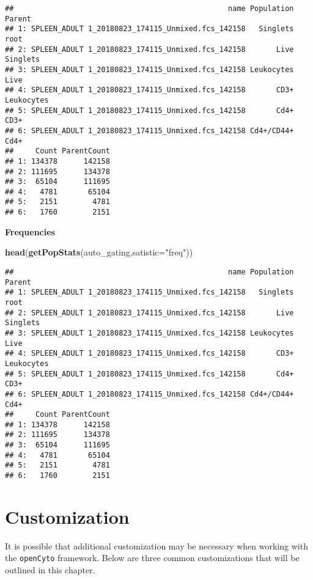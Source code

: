 \documentclass[]{book}
\newenvironment{Shaded}{\begin{snugshade}}{\end{snugshade}}
\newcommand{\DataTypeTok}[1]{\textcolor[rgb]{0.13,0.29,0.53}{#1}}
\newcommand{\KeywordTok}[1]{\textcolor[rgb]{0.13,0.29,0.53}{\textbf{#1}}}
\newcommand{\NormalTok}[1]{#1}
\newcommand{\StringTok}[1]{\textcolor[rgb]{0.31,0.60,0.02}{#1}}
\begin{document}
\begin{verbatim}
##                                                 name Population     Parent
## 1: SPLEEN_ADULT 1_20180823_174115_Unmixed.fcs_142158   Singlets       root
## 2: SPLEEN_ADULT 1_20180823_174115_Unmixed.fcs_142158       Live   Singlets
## 3: SPLEEN_ADULT 1_20180823_174115_Unmixed.fcs_142158 Leukocytes       Live
## 4: SPLEEN_ADULT 1_20180823_174115_Unmixed.fcs_142158       CD3+ Leukocytes
## 5: SPLEEN_ADULT 1_20180823_174115_Unmixed.fcs_142158       Cd4+       CD3+
## 6: SPLEEN_ADULT 1_20180823_174115_Unmixed.fcs_142158 Cd4+/CD44+       Cd4+
##     Count ParentCount
## 1: 134378      142158
## 2: 111695      134378
## 3:  65104      111695
## 4:   4781       65104
## 5:   2151        4781
## 6:   1760        2151
\end{verbatim}

\textbf{Frequencies}

\begin{Shaded}
\begin{Highlighting}[]
\KeywordTok{head}\NormalTok{(}\KeywordTok{getPopStats}\NormalTok{(auto_gating,}\DataTypeTok{satistic=}\StringTok{"freq"}\NormalTok{))}
\end{Highlighting}
\end{Shaded}

\begin{verbatim}
##                                                 name Population     Parent
## 1: SPLEEN_ADULT 1_20180823_174115_Unmixed.fcs_142158   Singlets       root
## 2: SPLEEN_ADULT 1_20180823_174115_Unmixed.fcs_142158       Live   Singlets
## 3: SPLEEN_ADULT 1_20180823_174115_Unmixed.fcs_142158 Leukocytes       Live
## 4: SPLEEN_ADULT 1_20180823_174115_Unmixed.fcs_142158       CD3+ Leukocytes
## 5: SPLEEN_ADULT 1_20180823_174115_Unmixed.fcs_142158       Cd4+       CD3+
## 6: SPLEEN_ADULT 1_20180823_174115_Unmixed.fcs_142158 Cd4+/CD44+       Cd4+
##     Count ParentCount
## 1: 134378      142158
## 2: 111695      134378
## 3:  65104      111695
## 4:   4781       65104
## 5:   2151        4781
## 6:   1760        2151
\end{verbatim}

\hypertarget{customization}{%
\chapter{Customization}\label{customization}}

It is possible that additional customization may be necessary when working with the \texttt{openCyto} framework. Below are three common customizations that will be outlined in this chapter.
\end{document}
